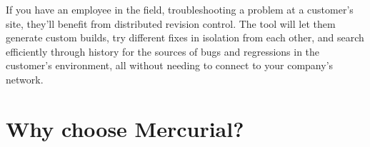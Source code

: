 If you have an employee in the field, troubleshooting a problem at a
customer's site, they'll benefit from distributed revision control.
The tool will let them generate custom builds, try different fixes in
isolation from each other, and search efficiently through history for
the sources of bugs and regressions in the customer's environment, all
without needing to connect to your company's network.

\section{Why choose Mercurial?}


